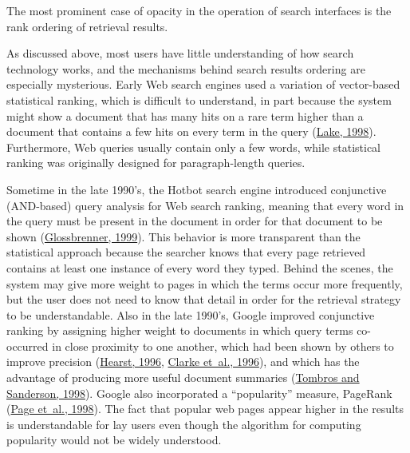 \documentclass[sigconf,nonacm,screen,pbalance]{acmart}
\begin{document}
The most prominent case of opacity in the operation of search interfaces is the rank ordering of
retrieval results.

As discussed above, most users have little understanding of how search technology works, and the
mechanisms behind search results ordering are especially mysterious. Early Web search engines used a
variation of vector-based statistical ranking, which is difficult to understand, in part because the
system might show a document that has many hits on a rare term higher than a document that contains a
few hits on every term in the query (\href{https://searchuserinterfaces.com/book/sui_references.html#nytimes98}{Lake, 1998}). Furthermore, Web queries
usually contain only a few words, while statistical ranking was originally designed for paragraph-length
queries.

Sometime in the late 1990's, the Hotbot search engine introduced conjunctive (AND-based) query analysis
for Web search ranking, meaning that every word in the query must be present in the document in order
for that document to be shown (\href{https://searchuserinterfaces.com/book/sui_references.html#glossbrenner1999sea}{Glossbrenner, 1999}). This behavior
is more transparent than the statistical approach because the searcher knows that every page retrieved
contains at least one instance of every word they typed. Behind the scenes, the system may give more
weight to pages in which the terms occur more frequently, but the user does not need to know that detail
in order for the retrieval strategy to be understandable. Also in the late 1990's, Google improved
conjunctive ranking by assigning higher weight to documents in which query terms co-occurred in close
proximity to one another, which had been shown by others to improve precision (\href{https://searchuserinterfaces.com/book/sui_references.html#hearst96a}{Hearst, 1996}, \href{https://searchuserinterfaces.com/book/sui_references.html#clarke96}{ Clarke et~al., 1996}), and which has the advantage of producing more
useful document summaries (\href{https://searchuserinterfaces.com/book/sui_references.html#tombros1998aqb}{Tombros and Sanderson, 1998}). Google also incorporated a ``popularity'' measure, PageRank (\href{https://searchuserinterfaces.com/book/sui_references.html#page1998pcr}{Page et~al., 1998}). The fact that
popular web pages appear higher in the results is understandable for lay users even though the algorithm
for computing popularity would not be widely understood.
\end{document}

